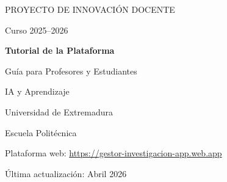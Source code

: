 \documentclass[11pt,a4paper]{article}
\begin{document}
\begin{titlepage}
    \centering
    \vspace*{2cm}

    {\Large\textsf{PROYECTO DE INNOVACIÓN DOCENTE}\par}
    \vspace{0.3cm}
    {\small Curso 2025--2026\par}

    \vspace{2cm}

    {\Huge\bfseries\textsf{\textcolor{azulUEx}{Tutorial de la Plataforma}}\par}

    \vspace{0.8cm}

    {\Large\textsf{Guía para Profesores y Estudiantes}\par}

    \vspace{1cm}

    {\large\textsf{IA y Aprendizaje}\par}

    \vspace{3cm}


    \vspace{1cm}

    {\large Universidad de Extremadura\par}
    \vspace{0.3cm}
    {\normalsize Escuela Politécnica\par}

    \vspace{2cm}

    {\small Plataforma web: \url{https://gestor-investigacion-app.web.app}\par}

    \vfill
    {\footnotesize Última actualización: Abril 2026\par}
\end{titlepage}

\tableofcontents
\newpage
\end{document}
